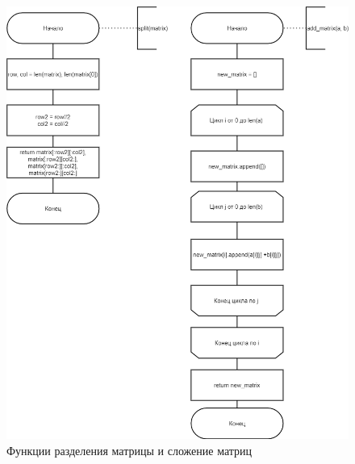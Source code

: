 \begin{figure}[H]
	\begin{center}
		\includegraphics[scale=0.5]{img/strassen1.png}
	\end{center}
	\captionsetup{justification=centering}
	\caption{Функции разделения матрицы и сложение матриц}
	\label{img:strassen1}
\end{figure}

